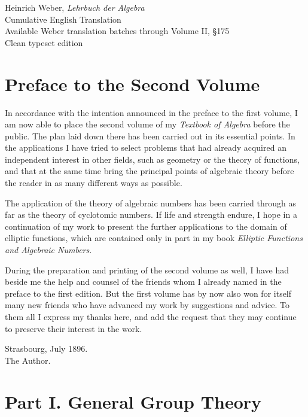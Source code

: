 \documentclass[11pt,a4paper]{book}
\begin{document}
\begin{titlepage}
\centering
\vspace*{0.25\textheight}
{\Large Heinrich Weber, \emph{Lehrbuch der Algebra}\\[0.8em]}
{\LARGE Cumulative English Translation\\[0.8em]}
{\large Available Weber translation batches through Volume II, \S175\\[1em]}
{\large Clean typeset edition}
\vfill
\end{titlepage}
\chapter*{Preface to the Second Volume}
In accordance with the intention announced in the preface to the first volume, I am now able to place the second volume of my \emph{Textbook of Algebra} before the public. The plan laid down there has been carried out in its essential points. In the applications I have tried to select problems that had already acquired an independent interest in other fields, such as geometry or the theory of functions, and that at the same time bring the principal points of algebraic theory before the reader in as many different ways as possible.

The application of the theory of algebraic numbers has been carried through as far as the theory of cyclotomic numbers. If life and strength endure, I hope in a continuation of my work to present the further applications to the domain of elliptic functions, which are contained only in part in my book \emph{Elliptic Functions and Algebraic Numbers}.

During the preparation and printing of the second volume as well, I have had beside me the help and counsel of the friends whom I already named in the preface to the first edition. But the first volume has by now also won for itself many new friends who have advanced my work by suggestions and advice. To them all I express my thanks here, and add the request that they may continue to preserve their interest in the work.

\begin{flushright}
Strasbourg, July 1896.\\
The Author.
\end{flushright}

\chapter*{Part I. General Group Theory}
\end{document}

